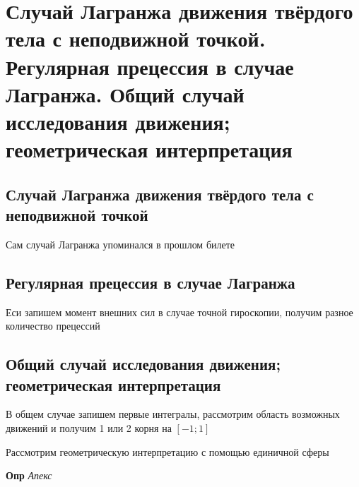 \documentclass[a4paper, 14pt]{article}
\begin{document}
    \section{Случай Лагранжа движения твёрдого тела с неподвижной точкой.
    Регулярная прецессия в случае Лагранжа.
    Общий случай исследования движения; геометрическая интерпретация}
    
    \subsection{Случай Лагранжа движения твёрдого тела с неподвижной точкой}
    
    Сам случай Лагранжа упоминался в прошлом билете
    
    \subsection{Регулярная прецессия в случае Лагранжа}
    
    Еси запишем момент внешних сил в случае точной гироскопии, получим разное количество прецессий
    
    \subsection{Общий случай исследования движения; геометрическая интерпретация}
    
    В общем случае запишем первые интегралы, рассмотрим область возможных движений и получим 1 или 2 корня на $[-1; 1]$
    
    Рассмотрим геометрическую интерпретацию с помощью единичной сферы
    
    \textbf{Опр} \textit{Апекс}
    
\end{document}

